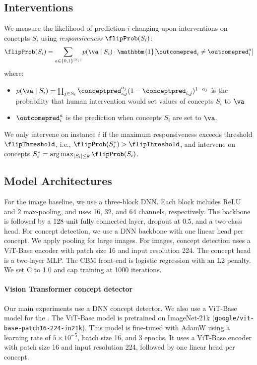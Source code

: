 \subsection{Interventions}
We measure the likelihood of prediction $i$ changing upon interventions on concepts $S_i$ using \emph{responsiveness} $\flipProb(S_i)$:
%
\begin{align*}
\flipProb(S_i) = \sum_{a \in \{0,1\}^{|S_i|}} p(\va\mid S_i) \cdot \mathbbm{1}[\outcomepred_i \neq \outcomepred_i^a]
\end{align*}
%
where:
\begin{itemize}
\item $p(\va\mid S_i) = \prod_{j \in S_i} \conceptpred_{i,j}^{a_j} (1-\conceptpred_{i,j})^{1-a_j}$ is the probability that human intervention would set values of concepts $S_i$ to $\va$
\item $\outcomepred_i^a$ is the prediction when concepts $S_i$ are set to $\va$.
\end{itemize}
%
We only intervene on instance $i$ if the maximum responsiveness exceeds threshold $\flipThreshold$, i.e., $\flipProb(S_i^*) > \flipThreshold$, and intervene on concepts $S_i^* = \arg\max_{|S_i| \leq k} \flipProb(S_i)$.

\subsection{Model Architectures}
For the  image baseline, we use a three-block DNN. Each block includes ReLU and 2 max-pooling, and uses 16, 32, and 64 channels, respectively. The backbone is followed by a 128-unit fully connected layer, dropout at 0.5, and a two-class head. For  concept detection, we use a DNN backbone with one linear head per concept. We apply pooling for large images. For  images, concept detection uses a ViT-Base encoder with patch size 16 and input resolution 224. The concept head is a two-layer MLP. The CBM front-end is logistic regression with an L2 penalty. We set C to 1.0 and cap training at 1000 iterations.


\paragraph{Vision Transformer concept detector}
Our main  experiments use a DNN concept detector. We also use a ViT-Base model for the . The ViT-Base model is pretrained on ImageNet-21k (\texttt{google/vit-base-patch16-224-in21k}). This model is fine-tuned with AdamW using a learning rate of $5\times10^{-5}$, batch size 16, and 3 epochs. It uses a ViT-Base encoder with patch size 16 and input resolution 224, followed by one linear head per concept.

